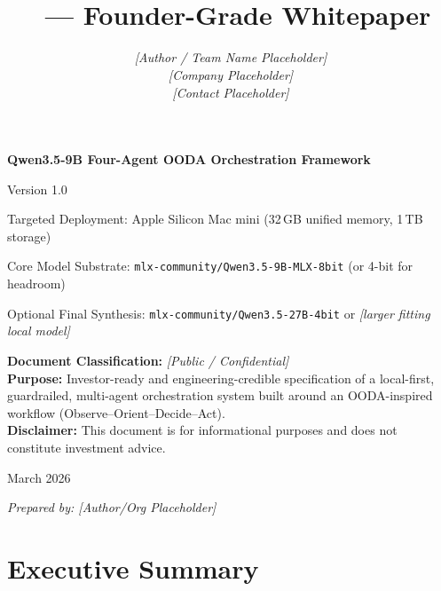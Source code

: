 \documentclass[11pt]{article}
\title{\FrameworkName\\\large \FrameworkVersion\ --- Founder-Grade Whitepaper}
\author{\textit{[Author / Team Name Placeholder]}\\\textit{[Company Placeholder]}\\\textit{[Contact Placeholder]}}
\date{\DateIssued}
\newcommand{\FrameworkName}{Qwen3.5-9B Four-Agent OODA Orchestration Framework}
\newcommand{\FrameworkVersion}{Version 1.0}
\newcommand{\TargetHardware}{Apple Silicon Mac mini (32\,GB unified memory, 1\,TB storage)}
\newcommand{\DateIssued}{March 2026}
\newcommand{\CoreModel}{\texttt{mlx-community/Qwen3.5-9B-MLX-8bit} (or 4-bit for headroom)}
\newcommand{\OptionalSynthesisModel}{\texttt{mlx-community/Qwen3.5-27B-4bit} or \textit{[larger fitting local model]}}
\newcommand{\Confidentiality}{\textit{[Public / Confidential]}} %
\begin{document}
\begin{titlepage}
  \centering
  \vspace*{1.0cm}

  \vspace{1.0cm}

  {\Huge\bfseries \FrameworkName \par}
  \vspace{0.2cm}
  {\Large \FrameworkVersion \par}

  \vspace{0.6cm}
  {\large Targeted Deployment: \TargetHardware \par}

  \vspace{0.4cm}
  {\large Core Model Substrate: \CoreModel \par}
  {\large Optional Final Synthesis: \OptionalSynthesisModel \par}

  \vfill

  \begin{tcolorbox}[colback=black!2, colframe=black!25, arc=2mm, boxrule=0.6pt, width=0.92\textwidth]
    \textbf{Document Classification:} \Confidentiality\\
    \textbf{Purpose:} Investor-ready and engineering-credible specification of a local-first, guardrailed, multi-agent orchestration system built around an OODA-inspired workflow (Observe--Orient--Decide--Act).\\
    \textbf{Disclaimer:} This document is for informational purposes and does not constitute investment advice.
  \end{tcolorbox}

  \vspace{0.8cm}
  {\large \DateIssued \par}
  \vspace{0.4cm}
  {\small \textit{Prepared by: [Author/Org Placeholder]}\par}

\end{titlepage}


\section*{Executive Summary}
\end{document}
